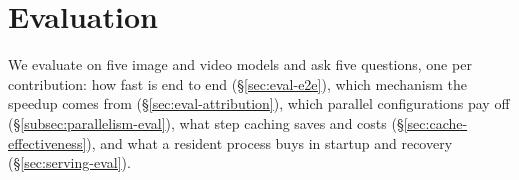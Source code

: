 \section{Evaluation}
\label{sec:evaluation}
%
%
\providecommand{\pend}{\textcolor{red}{--}}
\providecommand{\evtodo}[1]{\textcolor{red}{[#1]}}
\providecommand{\evfigure}[2]{\fbox{\parbox[c][#1][c]{0.95\linewidth}{\centering\footnotesize\textcolor{red}{#2}}}}

We evaluate \name on five image and video models and ask five questions, one per contribution: how fast \name is end to end (\S\ref{sec:eval-e2e}), which mechanism the speedup comes from (\S\ref{sec:eval-attribution}), which parallel configurations pay off (\S\ref{subsec:parallelism-eval}), what step caching saves and costs (\S\ref{sec:cache-effectiveness}), and what a resident process buys in startup and recovery (\S\ref{sec:serving-eval}).

